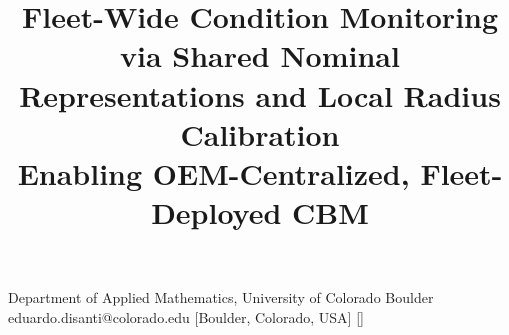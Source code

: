 \documentclass{trbunofficial}
\begin{document}
\title{Fleet-Wide Condition Monitoring via Shared Nominal Representations and Local Radius Calibration\\[0.4em]
\large Enabling OEM-Centralized, Fleet-Deployed CBM} 

{Department of Applied Mathematics, University of Colorado Boulder}
{eduardo.disanti@colorado.edu}
[Boulder, Colorado, USA]
[]


\maketitle

\end{document}
